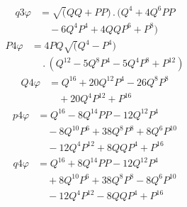 \[
\begin{aligned}q3\varphi&=\surd(QQ+PP)\, .\,(Q^4+4Q^6PP\\[5pt]&\quad{}-6Q^4P^4+4QQP^6+P^8)\end{aligned}
\]
\[
\begin{aligned}P4\varphi&=4PQ\surd(Q^4-P^4)\\[5pt]&\quad{}\, .\,(Q^{12}-5Q^8P^4-5Q^4P^8+P^{12})\end{aligned}
\]
\[
\begin{aligned}Q4\varphi&=Q^{16}+20Q^{12}P^4-26Q^8P^8\\[5pt]&\quad{}+20Q^4P^{12}+P^{16}\end{aligned}
\]
\[
\begin{aligned}p4\varphi&=Q^{16}-8Q^{14}PP-12Q^{12}P^4\\[5pt]&\quad{}-8Q^{10}P^6+38Q^8P^8+8Q^6P^{10}\\[5pt]&\quad{}-12Q^4P^{12}+8QQP^4+P^{16}\end{aligned}
\]
\[
\begin{aligned}q4\varphi&=Q^{16}+8Q^{14}PP-12Q^{12}P^4\\[5pt]&\quad{}+8Q^{10}P^6+38Q^8P^8-8Q^6P^{10}\\[5pt]&\quad{}-12Q^4P^{12}-8QQP^4+P^{16}\end{aligned}
\]


